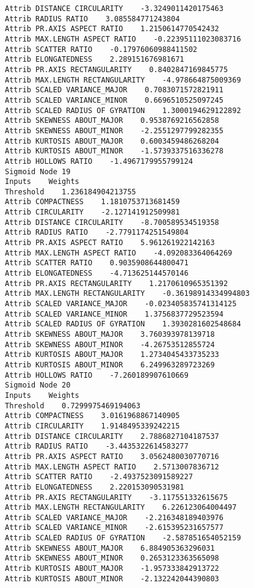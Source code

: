 \documentclass[
	article,			%
	11pt,				%
	oneside,			%
	a4paper,			%
	english,			%
	brazil,				%
	sumario=tradicional
	]{abntex2}
\begin{document}
\begin{lstlisting}
Attrib DISTANCE CIRCULARITY    -3.3249011420175463
Attrib RADIUS RATIO    3.085584771243804
Attrib PR.AXIS ASPECT RATIO    1.2150614770542432
Attrib MAX.LENGTH ASPECT RATIO    -0.22395111023083716
Attrib SCATTER RATIO    -0.17976060988411502
Attrib ELONGATEDNESS    2.289151676981671
Attrib PR.AXIS RECTANGULARITY    0.8402847169845775
Attrib MAX.LENGTH RECTANGULARITY    -4.978664875009369
Attrib SCALED VARIANCE_MAJOR    0.7083071572821911
Attrib SCALED VARIANCE_MINOR    0.6696510525097245
Attrib SCALED RADIUS OF GYRATION    1.3000194629122892
Attrib SKEWNESS ABOUT_MAJOR    0.9538769216562858
Attrib SKEWNESS ABOUT_MINOR    -2.2551297799282355
Attrib KURTOSIS ABOUT_MAJOR    0.6003459486268204
Attrib KURTOSIS ABOUT_MINOR    -1.5739337516336278
Attrib HOLLOWS RATIO    -1.4967179955799124
Sigmoid Node 19
Inputs    Weights
Threshold    1.236184904213755
Attrib COMPACTNESS    1.1810753713681459
Attrib CIRCULARITY    -2.127141912509981
Attrib DISTANCE CIRCULARITY    -8.700589534519358
Attrib RADIUS RATIO    -2.7791174251549804
Attrib PR.AXIS ASPECT RATIO    5.961261922142163
Attrib MAX.LENGTH ASPECT RATIO    -4.092083364064269
Attrib SCATTER RATIO    0.9035908644800471
Attrib ELONGATEDNESS    -4.713625144570146
Attrib PR.AXIS RECTANGULARITY    1.2170610965351392
Attrib MAX.LENGTH RECTANGULARITY    -0.36198914334994803
Attrib SCALED VARIANCE_MAJOR    -0.023405835741314125
Attrib SCALED VARIANCE_MINOR    1.3756837729523594
Attrib SCALED RADIUS OF GYRATION    1.3930281602548684
Attrib SKEWNESS ABOUT_MAJOR    3.760393978139718
Attrib SKEWNESS ABOUT_MINOR    -4.26753512855724
Attrib KURTOSIS ABOUT_MAJOR    1.2734045433735233
Attrib KURTOSIS ABOUT_MINOR    6.249963289723269
Attrib HOLLOWS RATIO    -7.260189907610669
Sigmoid Node 20
Inputs    Weights
Threshold    0.7299975469194063
Attrib COMPACTNESS    3.0161968867140905
Attrib CIRCULARITY    1.9148495339242215
Attrib DISTANCE CIRCULARITY    2.7886827104187537
Attrib RADIUS RATIO    -3.4435322614583277
Attrib PR.AXIS ASPECT RATIO    3.0562480030770716
Attrib MAX.LENGTH ASPECT RATIO    2.5713007836712
Attrib SCATTER RATIO    -2.4937523091589227
Attrib ELONGATEDNESS    2.220153090531981
Attrib PR.AXIS RECTANGULARITY    -3.117551332615675
Attrib MAX.LENGTH RECTANGULARITY    6.226123064004497
Attrib SCALED VARIANCE_MAJOR    -2.216348189403976
Attrib SCALED VARIANCE_MINOR    -2.615395231657577
Attrib SCALED RADIUS OF GYRATION    -2.587851654052159
Attrib SKEWNESS ABOUT_MAJOR    6.884905363296031
Attrib SKEWNESS ABOUT_MINOR    0.2653123363565098
Attrib KURTOSIS ABOUT_MAJOR    -1.957333842913722
Attrib KURTOSIS ABOUT_MINOR    -2.132242044390803

\end{lstlisting}
\end{document}
